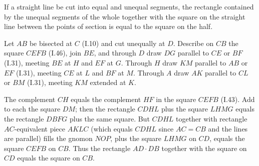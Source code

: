 \documentclass{rrxiv}
\begin{document}
\begin{claim}
\label{prop:II.5}
If a straight line be cut into equal and unequal segments, the
rectangle contained by the unequal segments of the whole together with
the square on the straight line between the points of section is equal
to the square on the half.
\end{claim}
\begin{evidence}[Proof of II.5]
\label{ev:II.5}
Let $AB$ be bisected at $C$ (I.10) and cut unequally at $D$.
Describe on $CB$ the square $CEFB$ (I.46), join $BE$, and through $D$
draw $DG$ parallel to $CE$ or $BF$ (I.31), meeting $BE$ at $H$ and
$EF$ at $G$.  Through $H$ draw $KM$ parallel to $AB$ or $EF$ (I.31),
meeting $CE$ at $L$ and $BF$ at $M$.  Through $A$ draw $AK$ parallel
to $CL$ or $BM$ (I.31), meeting $KM$ extended at $K$.

The complement $CH$ equals the complement $HF$ in the square $CEFB$
(I.43).  Add to each the square $DM$; then the rectangle $CDHL$ plus
the square $LHMG$ equals the rectangle $DBFG$ plus the same square.
But $CDHL$ together with rectangle $AC$-equivalent piece $AKLC$
(which equals $CDHL$ since $AC = CB$ and the lines are parallel)
fills the gnomon $NOP$, plus the square $LHMG$ on $CD$, equals the
square $CEFB$ on $CB$.  Thus the rectangle $AD\cdot DB$ together
with the square on $CD$ equals the square on $CB$.
\end{evidence}
\end{document}
